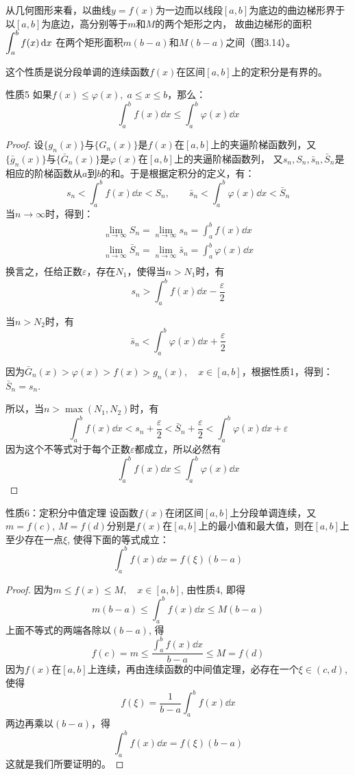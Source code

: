 从几何图形来看，以曲线$y=f(x)$为一边而以线段$[a,b]$为底边的曲边梯形界于以$[a,b]$为底边，高分别等于$m$和$M$的两个矩形之内，
故曲边梯形的面积$\displaystyle\int^b_a f(x)\,{\rm d} x$
在两个矩形面积$m(b-a)$和$M(b-a)$之间（图3.14）。

这个性质是说分段单调的连续函数$f(x)$在区间$[a,b]$上的定积分是有界的。

\begin{blk}{性质5}
如果$f(x)\le \varphi(x),\; a\le x\le b$，那么：
\[\int^b_a f(x)\dd x\le \int^b_a \varphi(x)\dd x\]
\end{blk}

\begin{proof}
    设$\{g_n(x)\}$与$\{G_n(x)\}$是$f(x)$在$[a,b]$上的夹逼阶梯函数列，又$\{\bar g_n(x)\}$与$\{\bar G_n(x)\}$是$\varphi(x)$在$[a,b]$上的夹逼阶梯函数列，
又$s_n, S_n, \bar s_n, \bar S_n$是相应的阶梯函数从$a$到$b$的和。于是根据定积分的定义，有：
\[s_n<\int^b_a f(x)\dd x<S_n,\qquad \bar s_n<\int^b_a \varphi(x)\dd x<\bar S_n\]
当$n\to\infty$时，得到：
\[\begin{split}
\lim_{n\to\infty}S_n =\lim_{n\to\infty}s_n =\int^b_a f(x)\dd x\\
\lim_{n\to\infty}\bar S_n =\lim_{n\to\infty}\bar s_n =\int^b_a \varphi(x)\dd x\\
\end{split}\]
换言之，任给正数$\varepsilon$，存在$N_1$，使得当$n>N_1$时，有
\[s_n>\int^b_a f(x)\dd x-\frac{\varepsilon}{2}\]

当$n>N_2$时，有
\[\bar s_n<\int^b_a \varphi(x)\dd x+\frac{\varepsilon}{2}\]

因为$\bar G_n(x)>\varphi(x)>f(x)>g_n(x),\quad x\in[a,b]$，根据性质1，得到：$\bar S_n=s_n$.

所以，当$n>\max(N_1,N_2)$时，有
\[\int^b_a f(x)\dd x<s_n+\frac{\varepsilon}{2}<\bar S_n+\frac{\varepsilon}{2}<\int^b_a \varphi(x)\dd x+\varepsilon\]
因为这个不等式对于每个正数$\varepsilon$都成立，所以必然有
\[\int^b_a f(x)\dd x\le \int^b_a \varphi(x)\dd x\]
\end{proof}

\begin{blk}{性质6：定积分中值定理}
   设函数$f(x)$在闭区间$[a,b]$上分段单调连续，又
$m=f(c)$, $M=f(d)$分别是$f(x)$在$[a,b]$上的最小值和最大值，则在$[a,b]$上至少存在一点$\xi$, 使得下面的等式成立：
\[\int^b_a f (x) \dd x=f(\xi) (b-a)\] 
\end{blk}

\begin{proof}
    因为$m\le f (x) \le M,\quad x\in [a,b]$, 
由性质4, 即得
\[m (b-a)\le \int^b_a f (x) \dd x\le M(b-a)\]
上面不等式的两端各除以$(b-a)$, 得
\[f(c)=m\le \frac{\int^b_a f (x) \dd x}{b-a}\le M=f(d)\]
因为$f(x)$在$[a,b]$上连续，再由连续函数的中间值定理，必存在一个$\xi\in(c,d)$, 使得
\[f(\xi)=\frac{1}{b-a}\int^b_a f (x) \dd x\]
两边再乘以$(b-a)$，得
\[\int^b_a f (x) \dd x=f(\xi)(b-a)\]
这就是我们所要证明的。
\end{proof}

